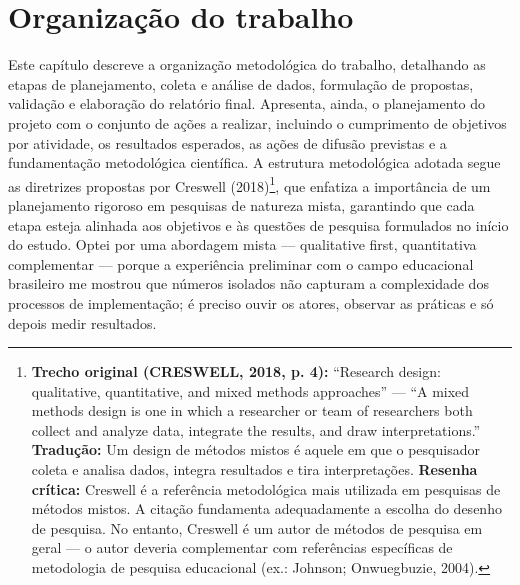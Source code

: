 
\chapter{Organização do trabalho}
\label{chap:organizacao_trabalho}

Este capítulo descreve a organização metodológica do trabalho, detalhando as etapas de planejamento, coleta e análise de dados, formulação de propostas, validação e elaboração do relatório final. Apresenta, ainda, o planejamento do projeto com o conjunto de ações a realizar, incluindo o cumprimento de objetivos por atividade, os resultados esperados, as ações de difusão previstas e a fundamentação metodológica científica. A estrutura metodológica adotada segue as diretrizes propostas por Creswell (2018)\footnote{\textbf{Trecho original (CRESWELL, 2018, p. 4):} ``Research design: qualitative, quantitative, and mixed methods approaches'' — ``A mixed methods design is one in which a researcher or team of researchers both collect and analyze data, integrate the results, and draw interpretations.'' \textbf{Tradução:} Um design de métodos mistos é aquele em que o pesquisador coleta e analisa dados, integra resultados e tira interpretações. \textbf{Resenha crítica:} Creswell é a referência metodológica mais utilizada em pesquisas de métodos mistos. A citação fundamenta adequadamente a escolha do desenho de pesquisa. No entanto, Creswell é um autor de métodos de pesquisa em geral — o autor deveria complementar com referências específicas de metodologia de pesquisa educacional (ex.: Johnson; Onwuegbuzie, 2004).}, que enfatiza a importância de um planejamento rigoroso em pesquisas de natureza mista, garantindo que cada etapa esteja alinhada aos objetivos e às questões de pesquisa formulados no início do estudo. Optei por uma abordagem mista — qualitative first, quantitativa complementar — porque a experiência preliminar com o campo educacional brasileiro me mostrou que números isolados não capturam a complexidade dos processos de implementação; é preciso ouvir os atores, observar as práticas e só depois medir resultados.

